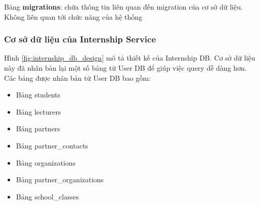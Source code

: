 \documentclass[./../main.tex]{subfiles}
\begin{document}
Bảng \textbf{migrations}: chứa thông tin liên quan đến migration của cơ sở dữ liệu. Không liên quan tới chức năng của hệ thống

\subsubsection{Cơ sở dữ liệu của Internship Service}

Hình \ref{fig:internship_db_design} mô tả thiết kế của Internship DB. Cơ sở dữ liệu này đã nhân bản lại một số bảng từ User DB để giúp việc query dễ dàng hơn. Các bảng được nhân bản từ User DB bao gồm:

\begin{itemize}
\item
  
  Bảng students
  
\item
  
  Bảng lecturers
  
\item
  
  Bảng partners
  
\item
  
  Bảng partner\_contacts
  
\item
  
  Bảng organizations
  
\item
  
  Bảng partner\_organizations
  
\item
  
  Bảng school\_classes
  
\end{itemize}
\end{document}
